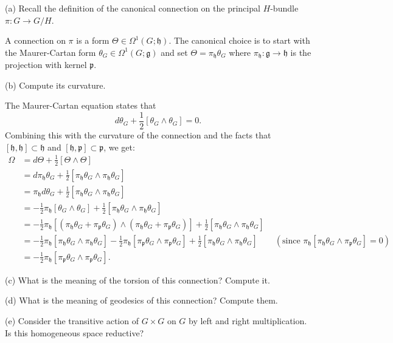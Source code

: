 \documentclass{../../templates/lkx_pset}
\begin{document}
\begin{parts}
	\begin{part}{(a)}
		Recall the definition of the canonical connection on the principal $H$-bundle $\pi : G\to G/H$.
	\end{part}

	A connection on $\pi$ is a form $\Theta \in \Omega^1(G; \mathfrak{h})$. The canonical choice is to start with the Maurer-Cartan form $\theta_G\in \Omega^1(G; \mathfrak{g})$ and set $\Theta =\pi_\mathfrak{h} \theta_G$ where $\pi_\mathfrak{h} : \mathfrak{g} \to \mathfrak{h}$ is the projection with kernel $\mathfrak{p}$.

	\begin{part}{(b)}
		Compute its curvature.
	\end{part}
	The Maurer-Cartan equation states that
	\[
    d\theta_G + \frac{1}{2}[\theta_G\wedge\theta_G]=0.
	\]
  Combining this with the curvature of the connection and the facts that $[\mathfrak{h},\mathfrak{h}]\subset \mathfrak{h}$ and $[\mathfrak{h},\mathfrak{p}]\subset\mathfrak{p}$, we get:
  \[
    \begin{aligned}
      \Omega 
      &= d\Theta + \frac{1}{2}[\Theta\wedge\Theta]\\
      &= d\pi_\mathfrak{h}\theta_G + \frac{1}{2}[\pi_\mathfrak{h}\theta_G\wedge \pi_\mathfrak{h}\theta_G]\\
      &= \pi_\mathfrak{h}d\theta_G + \frac{1}{2}[\pi_\mathfrak{h}\theta_G\wedge \pi_\mathfrak{h}\theta_G]\\
      &= -\frac{1}{2}\pi_\mathfrak{h}[\theta_G\wedge\theta_G] + \frac{1}{2}[\pi_\mathfrak{h}\theta_G\wedge \pi_\mathfrak{h}\theta_G]\\
      &= -\frac{1}{2}\pi_\mathfrak{h}[
      (\pi_\mathfrak{h}\theta_G + \pi_\mathfrak{p}\theta_G)\wedge(\pi_\mathfrak{h}\theta_G + \pi_\mathfrak{p}\theta_G)
    ] + \frac{1}{2}[\pi_\mathfrak{h}\theta_G\wedge \pi_\mathfrak{h}\theta_G]\\
      &= -\frac{1}{2}\pi_{\mathfrak{h}}[\pi_{\mathfrak{h}} \theta_G \wedge \pi_{\mathfrak{h}}\theta_G]
         -\frac{1}{2}\pi_{\mathfrak{h}}[\pi_{\mathfrak{p}} \theta_G \wedge \pi_{\mathfrak{p}}\theta_G]
         +\frac{1}{2}[\pi_{\mathfrak{h}} \theta_G \wedge \pi_{\mathfrak{h}}\theta_G]\quad\quad(\textrm{since } \pi_\mathfrak{h} [\pi_\mathfrak{h}\theta_G\wedge \pi_\mathfrak{p}\theta_G]=0)\\
      &= -\frac{1}{2}\pi_{\mathfrak{h}}[\pi_{\mathfrak{p}} \theta_G \wedge \pi_{\mathfrak{p}}\theta_G].
    \end{aligned}
  \]
	\begin{part}{(c)}
		What is the meaning of the torsion of this connection? Compute it.
	\end{part}

	\begin{part}{(d)}
		What is the meaning of geodesics of this connection? Compute them.
	\end{part}

	\begin{part}{(e)}
		Consider the transitive action of $G\times G$ on $G$ by left and right multiplication. Is this homogeneous space reductive?
	\end{part}
\end{parts}
\end{document}
